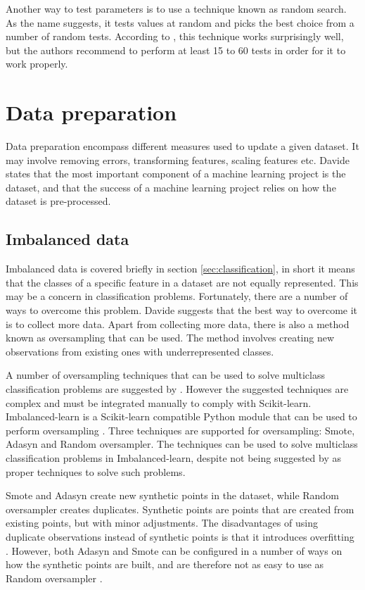 	Another way to test parameters is to use a technique known as random search. As the name suggests, it tests values at random and picks the best choice from a number of random tests. According to \cite{BOOK:9}, this technique works surprisingly well, but the authors recommend to perform at least 15 to 60 tests in order for it to work properly.

\section{Data preparation}
	Data preparation encompass different measures used to update a given dataset. It may involve removing errors, transforming features, scaling features etc. Davide \cite{ARTICLE:4} states that the most important component of a machine learning project is the dataset, and that the success of a machine learning project relies on how the dataset is pre-processed.

	\subsection{Imbalanced data} \label{sec:imbalancedtheory}
	Imbalanced data is covered briefly in section \ref{sec:classification}, in short it means that the classes of a specific feature in a dataset are not equally represented. This may be a concern in classification problems. Fortunately, there are a number of ways to overcome this problem. Davide \cite{ARTICLE:4} suggests that the best way to overcome it is to collect more data. Apart from collecting more data, there is also a method known as oversampling that can be used. The method involves creating new observations from existing ones with underrepresented classes.

	A number of oversampling techniques that can be used to solve multiclass classification problems are suggested by \cite{IP:6}. However the suggested techniques are complex and must be integrated manually to comply with Scikit-learn. Imbalanced-learn is a Scikit-learn compatible Python module that can be used to perform oversampling \cite{WEBSITE:22}. Three techniques are supported for oversampling: Smote, Adasyn and Random oversampler. The techniques can be used to solve multiclass classification problems in Imbalanced-learn, despite not being suggested by \cite{IP:6} as proper techniques to solve such problems. 

	Smote and Adasyn create new synthetic points in the dataset, while Random oversampler creates duplicates. Synthetic points are points that are created from existing points, but with minor adjustments. The disadvantages of using duplicate observations instead of synthetic points is that it introduces overfitting \cite{BOOK:12}. However, both Adasyn and Smote can be configured in a number of ways on how the synthetic points are built, and are therefore not as easy to use as Random oversampler \cite{WEBSITE:23}. 
	
